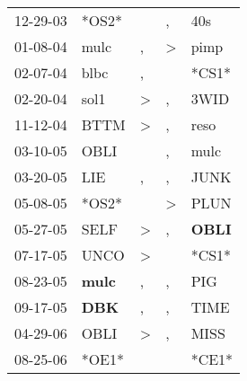 \begin{supertabular}{p{0.07\textwidth}p{0.06\textwidth}p{0.02\textwidth}p{0.02\textwidth}p{0.06\textwidth}}
          12-29-03\textsuperscript{} &                            *OS2* &               &             , &            40s\textsuperscript{} \\
          01-08-04\textsuperscript{} &           mulc\textsuperscript{} &             , &  \textgreater &           pimp\textsuperscript{} \\
          02-07-04\textsuperscript{} &           blbc\textsuperscript{} &             , &               &                            *CS1* \\
          02-20-04\textsuperscript{} &           sol1\textsuperscript{} &  \textgreater &             , &           3WID\textsuperscript{} \\
          11-12-04\textsuperscript{} &           BTTM\textsuperscript{} &  \textgreater &             , &           reso\textsuperscript{} \\
          03-10-05\textsuperscript{} &           OBLI\textsuperscript{} &               &             , &           mulc\textsuperscript{} \\
          03-20-05\textsuperscript{} &            LIE\textsuperscript{} &             , &             , &           JUNK\textsuperscript{} \\
          05-08-05\textsuperscript{} &                            *OS2* &               &  \textgreater &           PLUN\textsuperscript{} \\
          05-27-05\textsuperscript{} &           SELF\textsuperscript{} &  \textgreater &             , &  \textbf{OBLI\textsuperscript{}} \\
          07-17-05\textsuperscript{} &           UNCO\textsuperscript{} &  \textgreater &               &                            *CS1* \\
          08-23-05\textsuperscript{} &  \textbf{mulc\textsuperscript{}} &             , &             , &            PIG\textsuperscript{} \\
          09-17-05\textsuperscript{} &   \textbf{DBK\textsuperscript{}} &             , &             , &           TIME\textsuperscript{} \\
          04-29-06\textsuperscript{} &           OBLI\textsuperscript{} &  \textgreater &             , &           MISS\textsuperscript{} \\
          08-25-06\textsuperscript{} &                            *OE1* &               &               &                            *CE1* \\

\end{supertabular}
